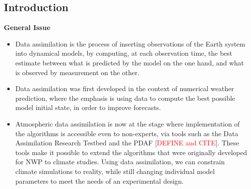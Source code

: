 \documentclass[draft,jgrga]{agutex}
\begin{document}
\begin{article}

%
%
\newcommand{\degree}{\ensuremath{^\circ}}


%
%

\section{Introduction}

 \textbf{General Issue}
\begin{itemize}
 \item Data assimilation is the process of inserting observations of the Earth system into dynamical models, by computing, at each observation time, the best estimate between what is predicted by the model on the one hand, and what is observed by measurement on the other.
 \item Data assimilation was first developed in the context of numerical weather prediction, where the emphasis is using data to compute the best possible model initial state, in order to improve forecasts.  
  \item Atmospheric data assimilation is now at the stage where implementation of the algorithms is accessible even to non-experts, via tools such as the Data Assimilation Research Testbed \citep[DART]{andersonetal2009} and the PDAF [\textcolor{red}{DEFINE and CITE}].   These tools make it possible to extend the algorithms that were originally developed for NWP to climate studies.  Using data assimilation, we can  constrain climate simulations  to reality, while still changing individual model parameters to meet the needs of an experimental design. 
\end{itemize}


\end{article}
\end{document}

